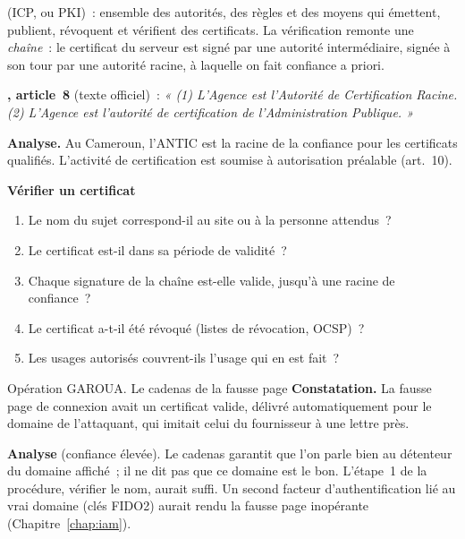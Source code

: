 \begin{boxdef}
 (ICP, ou PKI)~: ensemble des
autorités, des règles et des moyens qui émettent, publient, révoquent et
vérifient des certificats. La vérification remonte une \emph{chaîne}~:
le certificat du serveur est signé par une autorité intermédiaire, signée
à son tour par une autorité racine, à laquelle on fait confiance a priori.
\end{boxdef}

\begin{boxjuris}
\textbf{, article~8} (texte officiel)~:
\textit{« (1) L'Agence est l'Autorité de Certification Racine. (2) L'Agence
est l'autorité de certification de l'Administration Publique. »}

\medskip
\textbf{Analyse.} Au Cameroun, l'ANTIC est la racine de la confiance
pour les certificats qualifiés. L'activité de certification est soumise à
autorisation préalable (art.~10).
\end{boxjuris}

\begin{boxprocedure}
\textbf{Vérifier un certificat}
\begin{enumerate}
    \item Le nom du sujet correspond-il au site ou à la personne attendus~?
    \item Le certificat est-il dans sa période de validité~?
    \item Chaque signature de la chaîne est-elle valide, jusqu'à une racine
          de confiance~?
    \item Le certificat a-t-il été révoqué (listes de révocation, OCSP)~?
    \item Les usages autorisés couvrent-ils l'usage qui en est fait~?
\end{enumerate}
\end{boxprocedure}

\begin{boxscenario}{Opération GAROUA. Le cadenas de la fausse page}
\textbf{Constatation.} La fausse page de connexion avait un certificat
valide, délivré automatiquement pour le domaine de l'attaquant, qui
imitait celui du fournisseur à une lettre près.

\medskip
\textbf{Analyse} (confiance élevée). Le cadenas garantit que l'on parle
bien au détenteur du domaine affiché~; il ne dit pas que ce domaine est
le bon. L'étape~1 de la procédure, vérifier le nom, aurait suffi. Un
second facteur d'authentification lié au vrai domaine (clés FIDO2) aurait
rendu la fausse page inopérante (Chapitre~\ref{chap:iam}).
\end{boxscenario}

